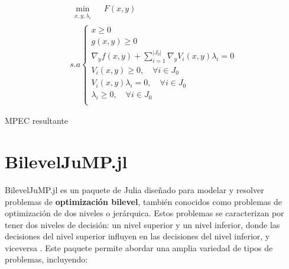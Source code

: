 		\begin{table}[H]

		\[\begin{array}{l}
			\underset{\substack{x, y, \lambda_i}}{\min} \quad F(x, y)\\
			s.a \left\{ \begin{array}{l}
				x \geq 0 \\
				g(x, y) \geq 0\\
				\nabla_{y} f(x, y) + \sum_{i=1}^{|J_{0}|} \nabla_{y} V_i(x, y) \lambda_i = 0 \\
				V_i(x, y) \geq 0, \quad \forall i \in J_{0} \\
				V_i(x, y)\lambda_i = 0, \quad \forall i \in J_{0} \\
				\lambda_i \geq 0, \quad \forall i \in J_{0}\\
			\end{array}\right.
		\end{array}\]
		\caption*{MPEC resultante}
		\end{table}

\section{BilevelJuMP.jl}
BilevelJuMP.jl es un paquete de Julia diseñado para modelar y resolver problemas de \textbf{optimización bilevel}, también conocidos como problemas de optimización de dos niveles o jerárquica. Estos problemas se caracterizan por tener dos niveles de decisión: un nivel superior y un nivel inferior, donde las decisiones del nivel superior influyen en las decisiones del nivel inferior, y viceversa \cite{BilevelJump}.
Este paquete permite abordar una amplia variedad de tipos de problemas, incluyendo:

